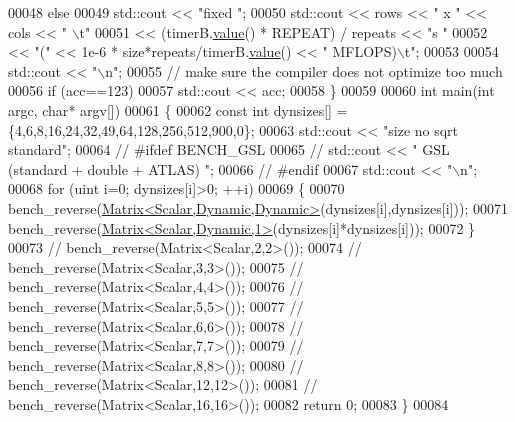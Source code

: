 \begin{DoxyCode}
00048   \textcolor{keywordflow}{else}
00049     std::cout << \textcolor{stringliteral}{"fixed "};
00050   std::cout << rows << \textcolor{stringliteral}{" x "} << cols << \textcolor{stringliteral}{" \(\backslash\)t"}
00051             << (timerB.\hyperlink{class_eigen_1_1_bench_timer_a26760f963ed8b64c126159bfea57735e}{value}() * REPEAT) / repeats << \textcolor{stringliteral}{"s "}
00052             << \textcolor{stringliteral}{"("} << 1e-6 * size*repeats/timerB.\hyperlink{class_eigen_1_1_bench_timer_a26760f963ed8b64c126159bfea57735e}{value}() << \textcolor{stringliteral}{" MFLOPS)\(\backslash\)t"};
00053 
00054   std::cout << \textcolor{stringliteral}{"\(\backslash\)n"};
00055   \textcolor{comment}{// make sure the compiler does not optimize too much}
00056   \textcolor{keywordflow}{if} (acc==123)
00057     std::cout << acc;
00058 \}
00059 
00060 \textcolor{keywordtype}{int} main(\textcolor{keywordtype}{int} argc, \textcolor{keywordtype}{char}* argv[])
00061 \{
00062   \textcolor{keyword}{const} \textcolor{keywordtype}{int} dynsizes[] = \{4,6,8,16,24,32,49,64,128,256,512,900,0\};
00063   std::cout << \textcolor{stringliteral}{"size            no sqrt                           standard"};
00064 \textcolor{comment}{//   #ifdef BENCH\_GSL}
00065 \textcolor{comment}{//   std::cout << "       GSL (standard + double + ATLAS)  ";}
00066 \textcolor{comment}{//   #endif}
00067   std::cout << \textcolor{stringliteral}{"\(\backslash\)n"};
00068   \textcolor{keywordflow}{for} (uint i=0; dynsizes[i]>0; ++i)
00069   \{
00070     bench\_reverse(\hyperlink{group___core___module}{Matrix<Scalar,Dynamic,Dynamic>}(dynsizes[i],dynsizes[i]));
00071     bench\_reverse(\hyperlink{group___core___module}{Matrix<Scalar,Dynamic,1>}(dynsizes[i]*dynsizes[i]));
00072   \}
00073 \textcolor{comment}{//   bench\_reverse(Matrix<Scalar,2,2>());}
00074 \textcolor{comment}{//   bench\_reverse(Matrix<Scalar,3,3>());}
00075 \textcolor{comment}{//   bench\_reverse(Matrix<Scalar,4,4>());}
00076 \textcolor{comment}{//   bench\_reverse(Matrix<Scalar,5,5>());}
00077 \textcolor{comment}{//   bench\_reverse(Matrix<Scalar,6,6>());}
00078 \textcolor{comment}{//   bench\_reverse(Matrix<Scalar,7,7>());}
00079 \textcolor{comment}{//   bench\_reverse(Matrix<Scalar,8,8>());}
00080 \textcolor{comment}{//   bench\_reverse(Matrix<Scalar,12,12>());}
00081 \textcolor{comment}{//   bench\_reverse(Matrix<Scalar,16,16>());}
00082   \textcolor{keywordflow}{return} 0;
00083 \}
00084 
\end{DoxyCode}

